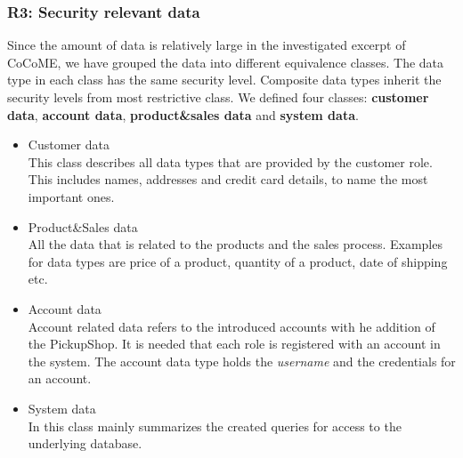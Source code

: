 \subsubsection{R3: Security relevant data}
\label{req_data}
Since the amount of data is relatively large in the investigated excerpt of CoCoME, we have grouped the data into different equivalence classes. The data type in each class has the same security level. Composite data types inherit the security levels from most restrictive class. We defined four classes: \textbf{customer data}, \textbf{account data}, \textbf{product\&sales data} and \textbf{system data}. 
\begin{itemize}
\item Customer data\\ This class describes all data types that are provided by the customer role. This includes names, addresses and credit card details, to name the most important ones. %
\item Product\&Sales data \\ All the data that is related to the products and the sales process. Examples for data types are price of a product, quantity of a product, date of shipping etc. %
\item Account data \\ Account related data refers to the introduced accounts with he addition of the PickupShop. It is needed that each role is registered with an account in the system. The account data type holds the \textit{username} and the credentials for an account. %
\item System data \\ In this class mainly summarizes the created queries for access to the underlying database. %
\end{itemize}
